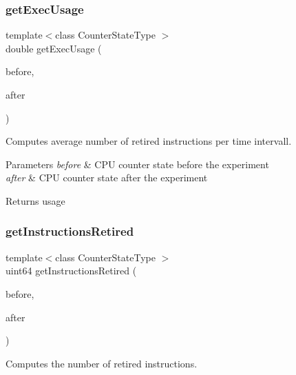 \subsubsection{get\+Exec\+Usage}
{\footnotesize\ttfamily template$<$class Counter\+State\+Type $>$ \\
double get\+Exec\+Usage (\begin{DoxyParamCaption}\item[{const Counter\+State\+Type \&}]{before,  }\item[{const Counter\+State\+Type \&}]{after }\end{DoxyParamCaption})\hspace{0.3cm}{\ttfamily [friend]}}



Computes average number of retired instructions per time intervall. 


\begin{DoxyParams}{Parameters}
{\em before} & C\+PU counter state before the experiment \\
\hline
{\em after} & C\+PU counter state after the experiment \\
\hline
\end{DoxyParams}
\begin{DoxyReturn}{Returns}
usage 
\end{DoxyReturn}
\mbox{\label{classBasicCounterState_af124718a7620c7bbca81232c2149f771}} 
\subsubsection{get\+Instructions\+Retired\hspace{0.1cm}{\footnotesize\ttfamily [1/2]}}
{\footnotesize\ttfamily template$<$class Counter\+State\+Type $>$ \\
uint64 get\+Instructions\+Retired (\begin{DoxyParamCaption}\item[{const Counter\+State\+Type \&}]{before,  }\item[{const Counter\+State\+Type \&}]{after }\end{DoxyParamCaption})\hspace{0.3cm}{\ttfamily [friend]}}



Computes the number of retired instructions. 


